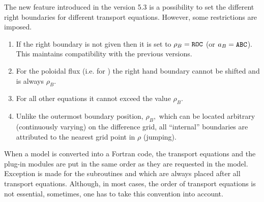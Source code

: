 The new feature introduced in the version 5.3 is a possibility to set the
different right boundaries for different transport equations.
However, some restrictions are imposed.
\begin{enumerate}
\vspace*{-1ex}
\item If the right boundary is not given then it is set to
$\rho_B=\tt ROC$ (or $a_B=\tt ABC$). 
This maintains compatibility with the previous versions. 
\vspace*{-1ex}
\item For the poloidal flux (i.e. for ) the right
hand boundary cannot be shifted and is always $\rho_B.$ 
\vspace*{-1ex}
\item For all other equations it cannot exceed the value $\rho_B.$
\vspace*{-1ex}
\item Unlike the outermost boundary position, $\rho_B,$ which can be
located arbitrary (continuously varying) on the difference grid, all
``internal'' 
boundaries are attributed to the nearest grid point in $\rho$ (jumping).
\end{enumerate}
\vspace*{-1ex}
When a model is converted into a Fortran code, the transport equations
and the plug-in modules are put in the same order as they are requested
in the model. 
Exception is made for the subroutines  and  which
are always placed after all transport equations.
Although, in most cases, the order of transport equations is not
essential, sometimes, one has to take this convention into account.

